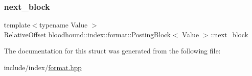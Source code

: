 \subsubsection{\texorpdfstring{next\+\_\+block}{next\_block}}
{\footnotesize\ttfamily template$<$typename Value $>$ \\
\mbox{\hyperlink{structbloodhound_1_1RelativeOffset}{Relative\+Offset}} \mbox{\hyperlink{structbloodhound_1_1index_1_1format_1_1PostingBlock}{bloodhound\+::index\+::format\+::\+Posting\+Block}}$<$ Value $>$\+::next\+\_\+block}



The documentation for this struct was generated from the following file\+:\begin{DoxyCompactItemize}
\item 
include/index/\mbox{\hyperlink{format_8hpp}{format.\+hpp}}\end{DoxyCompactItemize}
